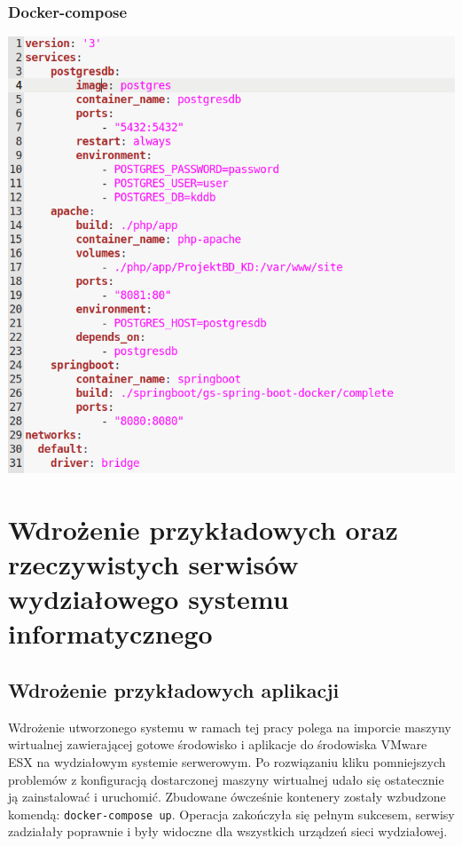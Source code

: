 \documentclass[polish, a4paper, 12pt, oneside]{book}
\begin{document}
	\subsection{Docker-compose}
	\begin{center}
		\includegraphics[width=160mm]{docker_compose.png}
	\end{center}
	
	\chapter{Wdrożenie przykładowych oraz rzeczywistych serwisów wydziałowego systemu informatycznego}
	\section{Wdrożenie przykładowych aplikacji}
	Wdrożenie utworzonego systemu w ramach tej pracy polega na imporcie maszyny wirtualnej zawierającej gotowe środowisko i aplikacje do środowiska VMware ESX na wydziałowym systemie serwerowym. Po rozwiązaniu kliku pomniejszych problemów z konfiguracją dostarczonej maszyny wirtualnej udało się ostatecznie ją zainstalować i uruchomić. Zbudowane ówcześnie kontenery zostały wzbudzone komendą: \texttt{docker-compose up}. Operacja zakończyła się pełnym sukcesem, serwisy zadziałały poprawnie i były widoczne dla wszystkich urządzeń sieci wydziałowej.
	
\end{document}
